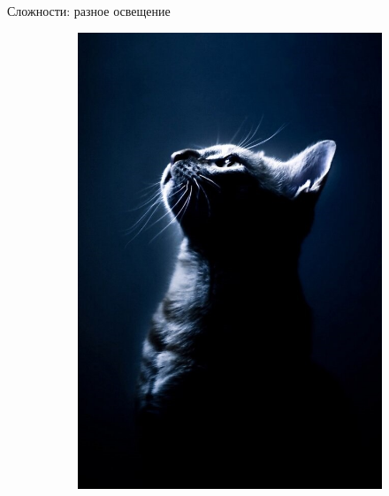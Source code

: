 \documentclass[aspectratio=169]{beamer}
\begin{document}
\begin{frame}{Сложности: разное освещение}
    \begin{figure}
        \begin{subfigure}[b]{.3\linewidth}
            \includegraphics[width=\linewidth]{graphs/fig9_0.jpg}
        \end{subfigure}
        \begin{subfigure}[b]{.3\linewidth}

\end{subfigure}
\end{figure}
\end{frame}
\end{document}
